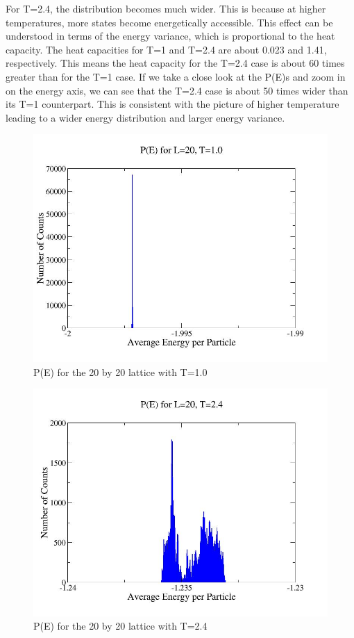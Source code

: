 \documentclass[%
oneside,                 %
final,                   %
10pt]{article}
\begin{document}
For T=2.4, the distribution becomes much wider.  This is because at higher temperatures, more states become energetically accessible.  This effect can be understood in terms of the energy variance, which is proportional to the heat capacity.  The heat capacities for T=1 and T=2.4 are about 0.023 and 1.41, respectively.  This means the heat capacity for the T=2.4 case is about 60 times greater than for the T=1 case.  If we take a close look at the P(E)s and zoom in on the energy axis, we can see that the T=2.4 case is about 50 times wider than its T=1 counterpart.  This is consistent with the picture of higher temperature leading to a wider energy distribution and larger energy variance. 

\begin{figure}[H]\label{fig:pe1}
  \centering
    \includegraphics[width=1.1 \textwidth]{pe1.jpg}
    \caption{P(E) for the 20 by 20 lattice with T=1.0}
\end{figure}


\begin{figure}[H]\label{fig:pe2}
  \centering
    \includegraphics[width=1.1 \textwidth]{p2.jpg}
    \caption{P(E) for the 20 by 20 lattice with T=2.4}
\end{figure}
\end{document}
